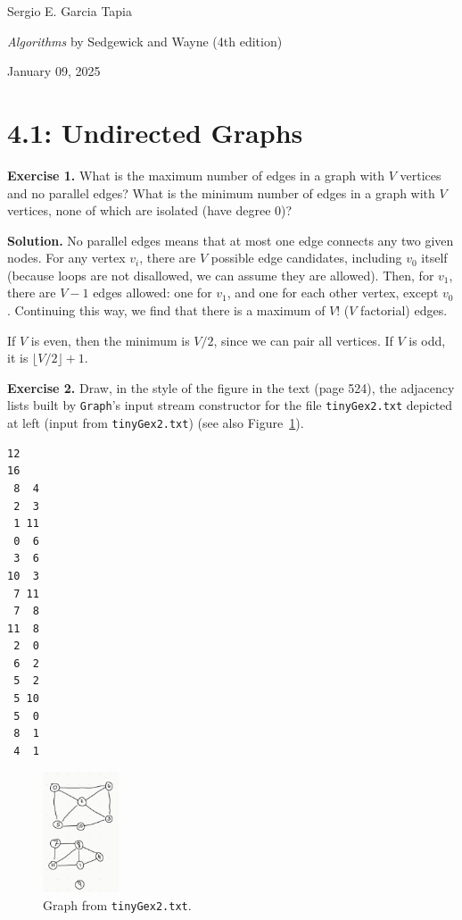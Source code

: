 \documentclass[12pt, a4paper]{article}
\newenvironment{ex}[2][Exercise]
{\par\medskip\noindent \textbf{#1 #2.}}
{\medskip}
\newenvironment{sol}[1][Solution]
{\par\medskip\noindent \textbf{#1.} }
{\medskip}
\begin{document}
	\noindent Sergio E. Garcia Tapia \hfill
	
	\noindent \emph{Algorithms} by Sedgewick and Wayne (4th edition) \cite{sedgewick_wayne}\hfill
	
	\noindent January 09, 2025\hfill 
	\section*{4.1: Undirected Graphs}
	\begin{ex}{1}
		What is the maximum number of edges in a graph with $V$ vertices and no parallel
		edges? What is the minimum number of edges in a graph with $V$ vertices, none of
		which are isolated (have degree $0$)?
	\end{ex}
	\begin{sol}
		No parallel edges means that at most one edge connects any two given nodes.
		For any vertex $v_i$, there are $V$ possible edge candidates, including $v_0$
		itself (because loops are not disallowed, we can assume they are allowed).
		Then, for $v_1$, there are $V-1$ edges allowed: one for $v_1$, and one for each
		other vertex, except $v_0$. Continuing this way, we find that there is
		a maximum of $V!$ ($V$ factorial) edges.
		
		If $V$ is even, then the minimum is $V / 2$, since we can pair all vertices.
		If $V$ is odd, it is $\lfloor V / 2\rfloor + 1$.
	\end{sol}
	\begin{ex}{2}
		Draw, in the style of the figure in the text (page 524), the adjacency lists
		built by \texttt{Graph}'s input stream constructor for the file \texttt{tinyGex2.txt}
		depicted at left (input from \texttt{tinyGex2.txt}) (see also Figure~\ref{fig:tinyGex2-graph}).
		\begin{lstlisting}[language={}]
12
16
 8  4
 2  3
 1 11
 0  6
 3  6
10  3
 7 11
 7  8
11  8
 2  0
 6  2
 5  2
 5 10
 5  0
 8  1
 4  1
		\end{lstlisting}
		\begin{figure}
			\centering
			\includegraphics[width=0.2\textwidth]{exercise-02-graph}
			\caption{Graph from \texttt{tinyGex2.txt}.}
			\label{fig:tinyGex2-graph}
		\end{figure}
	\end{ex}
\end{document}
